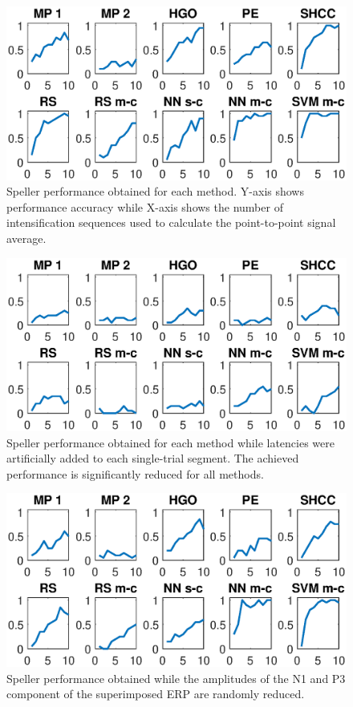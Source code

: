 \documentclass[brainsci,article,submit,moreauthors,pdftex,10pt,a4paper]{mdpi}
\begin{document}
\begin{figure}[H]
\centering
\includegraphics[width=15cm]{images/PerformanceTest.eps}
\caption{Speller performance obtained for each method.  Y-axis shows performance accuracy while X-axis shows the number of intensification sequences used to calculate the point-to-point signal average.}
\label{fig:performancetest}
\end{figure}


\begin{figure}[H]
\centering
\includegraphics[width=15cm]{images/PerformanceTestLatency.eps}
\caption{Speller performance obtained for each method while latencies were artificially added to each single-trial segment.  The achieved performance is significantly reduced for all methods.}
\label{fig:performancetestlatency}
\end{figure}


\begin{figure}[H]
\centering
\includegraphics[width=15cm]{images/PerformanceTestAmplitude.eps}
\caption{Speller performance obtained while the amplitudes of the N1 and P3 component of the superimposed ERP are randomly reduced.}
\label{fig:performancetestamplitude}
\end{figure}
\end{document}
